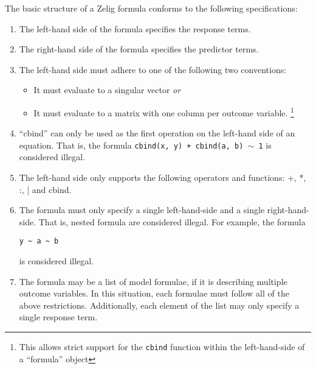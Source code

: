 \documentclass{article}
\newcommand{\tweedly}[0]{$\sim${ }}
\begin{document}
The basic structure of a Zelig formula conforms to the following specifications:

\begin{enumerate}

  \item The left-hand side of the formula specifies the response terms.

  \item The right-hand side of the formula specifies the predictor terms.


  \item The left-hand side must adhere to one of the following two conventions:

    \begin{itemize}

      \item It must evaluate to a singular vector \emph{or}

      \item It must evaluate to a matrix with one column per outcome variable.
        \footnote{
          This allows strict support for the {\tt cbind} function within the
          left-hand-side of a ``formula'' object
        }

    \end{itemize}

  \item ``cbind'' can only be used as the first operation on the left-hand side
    of an equation. That is, the formula
    {\tt cbind(x, y) + cbind(a, b) \tweedly 1} is considered illegal.

  \item The left-hand side only supports the following operators and functions:
    +, *, :, | and cbind.

  \item The formula must only specify a single left-hand-side and a single
    right-hand-side. That is, nested formula are considered illegal. For
    example, the formula \begin{verbatim}y ~ a ~ b\end{verbatim} is considered 
    illegal.

  \item The formula may be a list of model formulae, if it is describing
    multiple outcome variables. In this situation, each formulae must follow
    all of the above restrictions. Additionally, each element of the list may
    only specify a single response term.

\end{enumerate}
\end{document}
